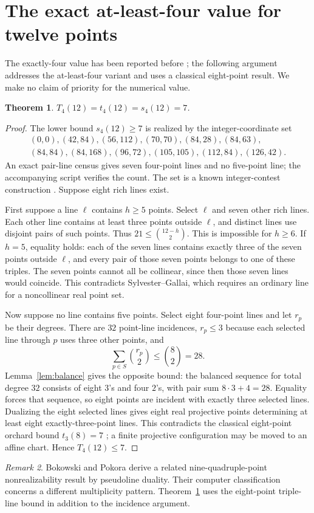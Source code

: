 \documentclass[11pt,a4paper]{amsart}
\newtheorem{theorem}{Theorem}[section]
\theoremstyle{remark}\newtheorem{remark}[theorem]{Remark}
\begin{document}
\section{The exact at-least-four value for twelve points}\label{sec:twelve}
The exactly-four value has been reported before \cite{OEISreal,Du}; the following argument addresses the at-least-four variant and uses a classical eight-point result. We make no claim of priority for the numerical value.
\begin{theorem}\label{thm:twelve}
$T_4(12)=t_4(12)=s_4(12)=7$.
\end{theorem}
\begin{proof}
The lower bound $s_4(12)\ge7$ is realized by the integer-coordinate set
\[
\begin{gathered}
(0,0),(42,84),(56,112),(70,70),(84,28),(84,63),\\
(84,84),(84,168),(96,72),(105,105),(112,84),(126,42).
\end{gathered}
\]
An exact pair-line census gives seven four-point lines and no five-point line; the accompanying script verifies the count. The set is a known integer-contest construction \cite{Contest,OEISreal}. Suppose eight rich lines exist.

First suppose a line $\ell$ contains $h\ge5$ points. Select $\ell$ and seven other rich lines. Each other line contains at least three points outside $\ell$, and distinct lines use disjoint pairs of such points. Thus $21\le\binom{12-h}2$. This is impossible for $h\ge6$. If $h=5$, equality holds: each of the seven lines contains exactly three of the seven points outside $\ell$, and every pair of those seven points belongs to one of these triples. The seven points cannot all be collinear, since then those seven lines would coincide. This contradicts Sylvester--Gallai, which requires an ordinary line for a noncollinear real point set.

Now suppose no line contains five points. Select eight four-point lines and let $r_p$ be their degrees. There are $32$ point-line incidences, $r_p\le3$ because each selected line through $p$ uses three other points, and
\[
 \sum_{p\in S}\binom{r_p}2\le\binom82=28.
\]
Lemma~\ref{lem:balance} gives the opposite bound: the balanced sequence for total degree $32$ consists of eight $3$'s and four $2$'s, with pair sum $8\cdot3+4=28$. Equality forces that sequence, so eight points are incident with exactly three selected lines. Dualizing the eight selected lines gives eight real projective points determining at least eight exactly-three-point lines. This contradicts the classical eight-point orchard bound $t_3(8)=7$ \cite[Table~1]{BGS}; a finite projective configuration may be moved to an affine chart. Hence $T_4(12)\le7$.
\end{proof}
\begin{remark}
Bokowski and Pokora \cite[Corollary~1.7]{BokowskiPokora} derive a related nine-quadruple-point nonrealizability result by pseudoline duality. Their computer classification concerns a different multiplicity pattern. Theorem~\ref{thm:twelve} uses the eight-point triple-line bound in addition to the incidence argument.
\end{remark}
\end{document}
